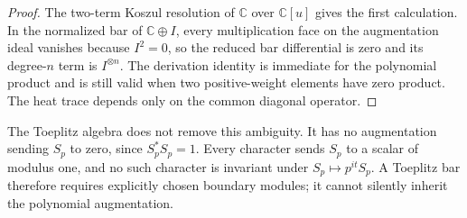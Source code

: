 \begin{proof}
The two-term Koszul resolution of \(\mathbb C\) over \(\mathbb C[u]\)
gives the first calculation.  In the normalized bar of
\(\mathbb C\oplus I\), every multiplication face on the augmentation ideal
vanishes because \(I^2=0\), so the reduced bar differential is zero and its
degree-\(n\) term is \(I^{\otimes n}\).  The derivation identity is immediate
for the polynomial product and is still valid when two positive-weight
elements have zero product.  The heat trace depends only on the common
diagonal operator.
\end{proof}

\begin{remark}
The Toeplitz algebra does not remove this ambiguity.  It has no augmentation
sending \(S_p\) to zero, since \(S_p^*S_p=1\).  Every character sends
\(S_p\) to a scalar of modulus one, and no such character is invariant under
\(S_p\mapsto p^{it}S_p\).  A Toeplitz bar therefore requires explicitly
chosen boundary modules; it cannot silently inherit the polynomial
augmentation.
\end{remark}

